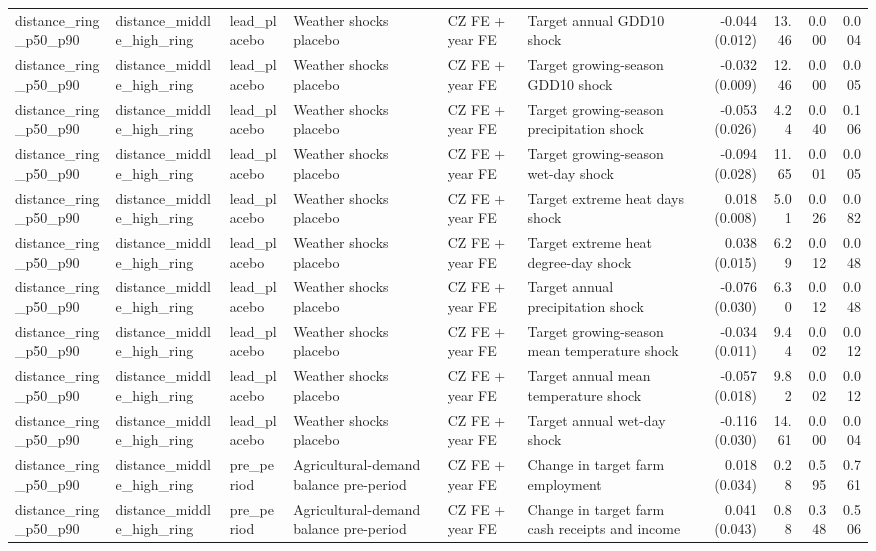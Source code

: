 \begin{tabular}{llllllrrrr}
distance_ring_p50_p90 & distance_middle_high_ring & lead_placebo & Weather shocks placebo & CZ FE + year FE & Target annual GDD10 shock & -0.044 (0.012) & 13.46 & 0.000 & 0.004 \\
distance_ring_p50_p90 & distance_middle_high_ring & lead_placebo & Weather shocks placebo & CZ FE + year FE & Target growing-season GDD10 shock & -0.032 (0.009) & 12.46 & 0.000 & 0.005 \\
distance_ring_p50_p90 & distance_middle_high_ring & lead_placebo & Weather shocks placebo & CZ FE + year FE & Target growing-season precipitation shock & -0.053 (0.026) & 4.24 & 0.040 & 0.106 \\
distance_ring_p50_p90 & distance_middle_high_ring & lead_placebo & Weather shocks placebo & CZ FE + year FE & Target growing-season wet-day shock & -0.094 (0.028) & 11.65 & 0.001 & 0.005 \\
distance_ring_p50_p90 & distance_middle_high_ring & lead_placebo & Weather shocks placebo & CZ FE + year FE & Target extreme heat days shock & 0.018 (0.008) & 5.01 & 0.026 & 0.082 \\
distance_ring_p50_p90 & distance_middle_high_ring & lead_placebo & Weather shocks placebo & CZ FE + year FE & Target extreme heat degree-day shock & 0.038 (0.015) & 6.29 & 0.012 & 0.048 \\
distance_ring_p50_p90 & distance_middle_high_ring & lead_placebo & Weather shocks placebo & CZ FE + year FE & Target annual precipitation shock & -0.076 (0.030) & 6.30 & 0.012 & 0.048 \\
distance_ring_p50_p90 & distance_middle_high_ring & lead_placebo & Weather shocks placebo & CZ FE + year FE & Target growing-season mean temperature shock & -0.034 (0.011) & 9.44 & 0.002 & 0.012 \\
distance_ring_p50_p90 & distance_middle_high_ring & lead_placebo & Weather shocks placebo & CZ FE + year FE & Target annual mean temperature shock & -0.057 (0.018) & 9.82 & 0.002 & 0.012 \\
distance_ring_p50_p90 & distance_middle_high_ring & lead_placebo & Weather shocks placebo & CZ FE + year FE & Target annual wet-day shock & -0.116 (0.030) & 14.61 & 0.000 & 0.004 \\
distance_ring_p50_p90 & distance_middle_high_ring & pre_period & Agricultural-demand balance pre-period & CZ FE + year FE & Change in target farm employment & 0.018 (0.034) & 0.28 & 0.595 & 0.761 \\
distance_ring_p50_p90 & distance_middle_high_ring & pre_period & Agricultural-demand balance pre-period & CZ FE + year FE & Change in target farm cash receipts and income & 0.041 (0.043) & 0.88 & 0.348 & 0.506 \\

\end{tabular}
